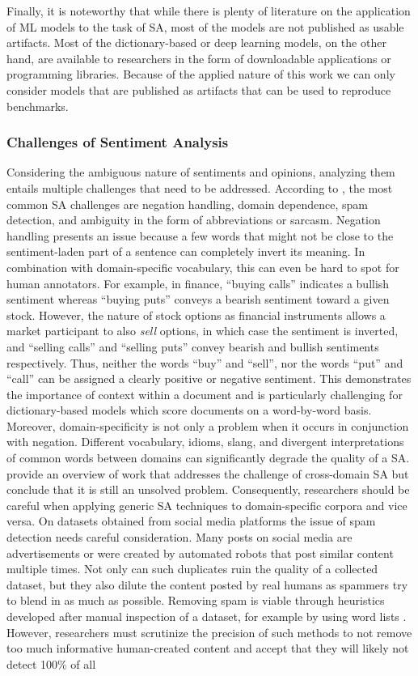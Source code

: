 Finally, it is noteworthy that while there is plenty of literature on the application of ML models to the task of SA, most of the models are not published as usable artifacts. Most of the dictionary-based or deep learning models, on the other hand, are available to researchers in the form of downloadable applications or programming libraries. Because of the applied nature of this work we can only consider models that are published as artifacts that can be used to reproduce benchmarks.


\subsubsection{Challenges of Sentiment Analysis}
\label{section-sa-challenges}
Considering the ambiguous nature of sentiments and opinions, analyzing them entails multiple challenges that need to be addressed. According to , the most common SA challenges are negation handling, domain dependence, spam detection, and ambiguity in the form of abbreviations or sarcasm. Negation handling presents an issue because a few words that might not be close to the sentiment-laden part of a sentence can completely invert its meaning. In combination with domain-specific vocabulary, this can even be hard to spot for human annotators. For example, in finance, ``buying calls'' indicates a bullish sentiment whereas ``buying puts'' conveys a bearish sentiment toward a given stock. However, the nature of stock options as financial instruments allows a market participant to also \emph{sell} options, in which case the sentiment is inverted, and ``selling calls'' and ``selling puts'' convey bearish and bullish sentiments respectively. Thus, neither the words ``buy'' and ``sell'', nor the words ``put'' and ``call'' can be assigned a clearly positive or negative sentiment. This demonstrates the importance of context within a document and is particularly challenging for dictionary-based models which score documents on a word-by-word basis. Moreover, domain-specificity is not only a problem when it occurs in conjunction with negation. Different vocabulary, idioms, slang, and divergent interpretations of common words between domains can significantly degrade the quality of a SA.  provide an overview of work that addresses the challenge of cross-domain SA but conclude that it is still an unsolved problem. Consequently, researchers should be careful when applying generic SA techniques to domain-specific corpora and vice versa. On datasets obtained from social media platforms the issue of spam detection needs careful consideration. Many posts on social media are advertisements or were created by automated robots that post similar content multiple times. Not only can such duplicates ruin the quality of a collected dataset, but they also dilute the content posted by real humans as spammers try to blend in as much as possible. Removing spam is viable through heuristics developed after manual inspection of a dataset, for example by using word lists . However, researchers must scrutinize the precision of such methods to not remove too much informative human-created content and accept that they will likely not detect 100\% of all 